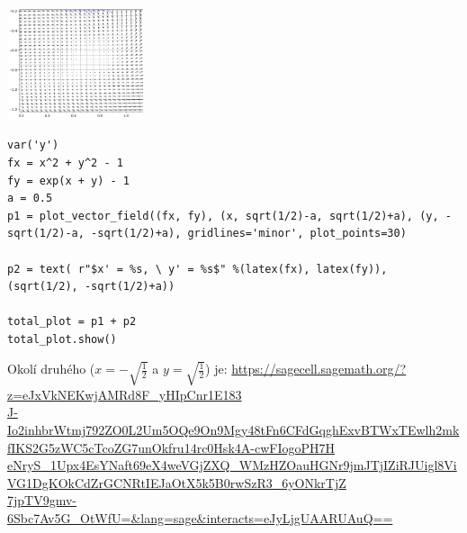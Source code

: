 \documentclass[12pt]{article}					%
\begin{document}
\begin{priklad}
\begin{reseni}
		\begin{center}
			\includegraphics[width=0.3\textwidth]{DU4_1.png}
		\end{center}
		\vspace{-5em}

{\tiny
\begin{verbatim}
var('y')
fx = x^2 + y^2 - 1
fy = exp(x + y) - 1
a = 0.5
p1 = plot_vector_field((fx, fy), (x, sqrt(1/2)-a, sqrt(1/2)+a), (y, -sqrt(1/2)-a, -sqrt(1/2)+a), gridlines='minor', plot_points=30)

p2 = text( r"$x' = %s, \ y' = %s$" %(latex(fx), latex(fy)), (sqrt(1/2), -sqrt(1/2)+a))

total_plot = p1 + p2
total_plot.show()
\end{verbatim}
}


		Okolí druhého ($x = -\sqrt{\frac{1}{2}}$ a $y = \sqrt{\frac{1}{2}}$) je: {\tiny \href{https://sagecell.sagemath.org/?z=eJxVkNEKwjAMRd8F_yHIpCnr1E183J-Io2inhbrWtmj792ZO0L2Um5OQe9On9Mgy48tFn6CFdGqghExvBTWxTEwlh2mkfIKS2G5zWC5cTcoZG7unOkfru14rc0Hsk4A-cwFIogoPH7HeNryS_1Upx4EsYNaft69eX4weVGjZXQ_WMzHZOauHGNr9jmJTjIZiRJUigl8ViVG1DgKOkCdZrGCNRtIEJaOtX5k5B0rwSzR3_6yONkrTjZ7jpTV9gmv-6Sbc7Av5G_OtWfU=&lang=sage&interacts=eJyLjgUAARUAuQ==}{https://sagecell.sagemath.org/?z=eJxVkNEKwjAMRd8F\_yHIpCnr1E183}}\\
		{\tiny \href{https://sagecell.sagemath.org/?z=eJxVkNEKwjAMRd8F_yHIpCnr1E183J-Io2inhbrWtmj792ZO0L2Um5OQe9On9Mgy48tFn6CFdGqghExvBTWxTEwlh2mkfIKS2G5zWC5cTcoZG7unOkfru14rc0Hsk4A-cwFIogoPH7HeNryS_1Upx4EsYNaft69eX4weVGjZXQ_WMzHZOauHGNr9jmJTjIZiRJUigl8ViVG1DgKOkCdZrGCNRtIEJaOtX5k5B0rwSzR3_6yONkrTjZ7jpTV9gmv-6Sbc7Av5G_OtWfU=&lang=sage&interacts=eJyLjgUAARUAuQ==}{J-Io2inhbrWtmj792ZO0L2Um5OQe9On9Mgy48tFn6CFdGqghExvBTWxTEwlh2mkfIKS2G5zWC5cTcoZG7unOkfru14rc0Hsk4A-cwFIogoPH7H}}\\
		{\tiny \href{https://sagecell.sagemath.org/?z=eJxVkNEKwjAMRd8F_yHIpCnr1E183J-Io2inhbrWtmj792ZO0L2Um5OQe9On9Mgy48tFn6CFdGqghExvBTWxTEwlh2mkfIKS2G5zWC5cTcoZG7unOkfru14rc0Hsk4A-cwFIogoPH7HeNryS_1Upx4EsYNaft69eX4weVGjZXQ_WMzHZOauHGNr9jmJTjIZiRJUigl8ViVG1DgKOkCdZrGCNRtIEJaOtX5k5B0rwSzR3_6yONkrTjZ7jpTV9gmv-6Sbc7Av5G_OtWfU=&lang=sage&interacts=eJyLjgUAARUAuQ==}{eNryS\_1Upx4EsYNaft69eX4weVGjZXQ\_WMzHZOauHGNr9jmJTjIZiRJUigl8ViVG1DgKOkCdZrGCNRtIEJaOtX5k5B0rwSzR3\_6yONkrTjZ}}\\
		{\tiny \href{https://sagecell.sagemath.org/?z=eJxVkNEKwjAMRd8F_yHIpCnr1E183J-Io2inhbrWtmj792ZO0L2Um5OQe9On9Mgy48tFn6CFdGqghExvBTWxTEwlh2mkfIKS2G5zWC5cTcoZG7unOkfru14rc0Hsk4A-cwFIogoPH7HeNryS_1Upx4EsYNaft69eX4weVGjZXQ_WMzHZOauHGNr9jmJTjIZiRJUigl8ViVG1DgKOkCdZrGCNRtIEJaOtX5k5B0rwSzR3_6yONkrTjZ7jpTV9gmv-6Sbc7Av5G_OtWfU=&lang=sage&interacts=eJyLjgUAARUAuQ==}{7jpTV9gmv-6Sbc7Av5G\_OtWfU=\&lang=sage\&interacts=eJyLjgUAARUAuQ==}}\\[-2em]


\end{reseni}
\end{priklad}
\end{document}
